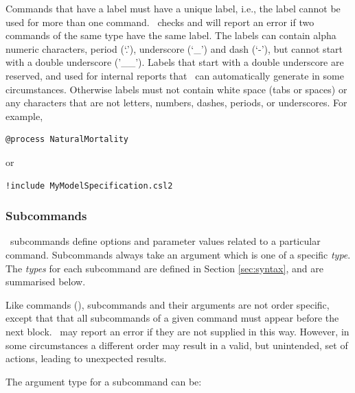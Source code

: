 Commands that have a label must have a unique label, i.e., the label cannot be used for more than one command. \CNAME\ checks and will report an error if two commands of the same type have the same label. The labels can contain alpha numeric characters, period (`.'), underscore (`\_') and dash (`-'), but cannot start with a double underscore ('\_\_'). Labels that start with a double underscore are reserved, and used for internal reports that \CNAME\ can automatically generate in some circumstances. Otherwise labels must not contain white space (tabs or spaces) or any characters that are not letters, numbers, dashes, periods, or underscores. For example,

{\small{\begin{verbatim}
@process NaturalMortality
\end{verbatim}}}
or
{\small{\begin{verbatim}
!include MyModelSpecification.csl2
\end{verbatim}}}

\subsubsection{Subcommands}

\CNAME\ subcommands define options and parameter values related to a particular command. Subcommands always take an argument which is one of a specific \emph{type}. The \emph{types} for each subcommand are defined in Section \ref{sec:syntax}, and are summarised below.

Like commands (), subcommands and their arguments are not order specific, except that that all subcommands of a given command must appear before the next  block. \CNAME\ may report an error if they are not supplied in this way. However, in some circumstances a different order may result in a valid, but unintended, set of actions, leading to unexpected results.

The argument type for a subcommand can be:

